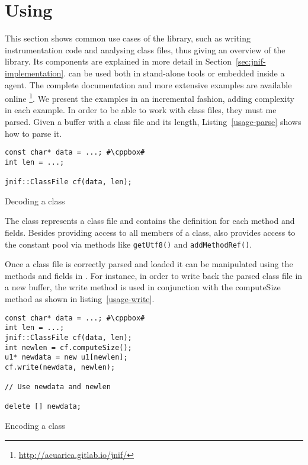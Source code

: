 \section{Using \jnif{}}\label{sec:jnif-usage}

This section shows common use cases of the \jnif{} library, 
such as writing instrumentation code and analysing class files, 
thus giving an overview of the library.
Its components are explained in more detail in Section~\ref{sec:jnif-implementation}.
\jnif{} can be used both in stand-alone tools or
embedded inside a \jvmti{} agent.
The complete \api{} documentation and more extensive examples are available online%
\footnote{\url{http://acuarica.gitlab.io/jnif/}}.
We present the examples in an incremental fashion,
adding complexity in each example.
In order to be able to work with class files, they must me parsed. 
Given a buffer with a class file and its length,
Listing~\ref{usage-parse} shows how to parse it.

\begin{listing}
\begin{verbatim}
const char* data = ...; #\cppbox#
int len = ...;

jnif::ClassFile cf(data, len);
\end{verbatim}
\caption{Decoding a class}
\label{usage-parse}
\end{listing}

The class  represents a \java{} class file and contains the definition for each method and fields. 
Besides providing access to all members of a class,
 also provides access to the constant pool
via methods like \texttt{getUtf8()} and \texttt{addMethodRef()}.

Once a class file is correctly parsed and loaded it can be manipulated using the methods and fields in .
For instance,
in order to write back the parsed class file in a new buffer,
the write method is used in conjunction with the computeSize method as shown in listing~\ref{usage-write}.

\begin{listing}
\begin{verbatim}
const char* data = ...; #\cppbox#
int len = ...;
jnif::ClassFile cf(data, len);
int newlen = cf.computeSize();
u1* newdata = new u1[newlen];
cf.write(newdata, newlen);

// Use newdata and newlen

delete [] newdata;
\end{verbatim}
\caption{Encoding a class}
\label{usage-write}
\end{listing}

